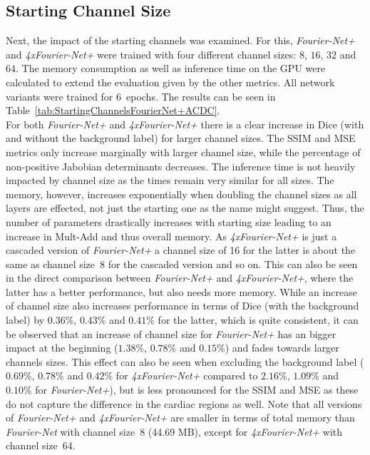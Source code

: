 \subsection{Starting Channel Size} \label{SubSec:ResultsStartingChannelsACDC}
Next, the impact of the starting channels was examined. For this, \emph{Fourier-Net+} and \emph{4xFourier-Net+} were trained with four different channel sizes: $8$, $16$, $32$ and $64$. The memory consumption as well as inference time on the GPU were calculated to extend the evaluation given by the other metrics. All network variants were trained for 6~epochs. The results can be seen in Table~\ref{tab:StartingChannelsFourierNet+ACDC}.\\
For both \emph{Fourier-Net+} and \emph{4xFourier-Net+} there is a clear increase in Dice (with and without the background label) for larger channel sizes. The SSIM and MSE metrics only increase marginally with larger channel size, while the percentage of non-positive Jabobian determinants decreases. The inference time is not heavily impacted by channel size as the times remain very similar for all sizes. The memory, however, increases exponentially when doubling the channel sizes as all layers are effected, not just the starting one as the name might suggest. Thus, the number of parameters drastically increases with starting size leading to an increase in Mult-Add and thus overall memory. As \emph{4xFourier-Net+} is just a cascaded version of \emph{Fourier-Net+} a channel size of 16 for the latter is about the same as channel size~8 for the cascaded version and so on. This can also be seen in the direct comparison between \emph{Fourier-Net+} and \emph{4xFourier-Net+}, where the latter has a better performance, but also needs more memory. While an increase of channel size also increases performance in terms of Dice (with the background label) by $0.36\%$, $0.43\%$ and $0.41\%$ for the latter, which is quite consistent, it can be observed that an increase of channel size for \emph{Fourier-Net+} has an bigger impact at the beginning ($1.38\%$, $0.78\%$ and $0.15\%$) and fades towards larger channels sizes. This effect can also be seen when excluding the background label ($0.69\%$, $0.78\%$ and $0.42\%$ for \emph{4xFourier-Net+} compared to $2.16\%$, $1.09\%$ and $0.10\%$ for \emph{Fourier-Net+}), but is less pronounced for the SSIM and MSE as these do not capture the difference in the cardiac regions as well. Note that all versions of \emph{Fourier-Net+} and \emph{4xFourier-Net+} are smaller in terms of total memory than \emph{Fourier-Net} with channel size~8 (44.69 MB), except for \emph{4xFourier-Net+} with channel size~64.

